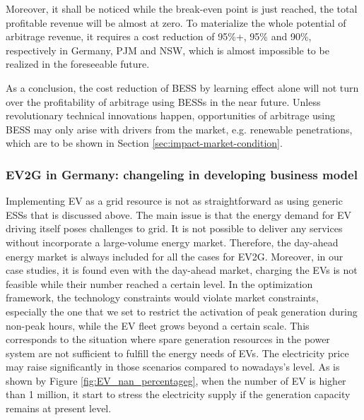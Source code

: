 Moreover, it shall be noticed while the break-even point is just reached, the total profitable revenue will be almost at zero. To materialize the whole potential of arbitrage revenue, it requires a cost reduction of 95\%+, 95\% and 90\%, respectively in Germany, PJM and NSW, which is almost impossible to be realized in the foreseeable future.

As a conclusion, the cost reduction of BESS by learning effect alone will not turn over the profitability of arbitrage using BESSs in the near future. Unless revolutionary technical innovations happen, opportunities of arbitrage using BESS may only arise with drivers from the market, e.g. renewable penetrations, which are to be shown in Section \ref{sec:impact-market-condition}.

\subsubsection{EV2G in Germany: changeling in developing business model}
Implementing EV as a grid resource is not as straightforward as using generic ESSs that is discussed above. The main issue is that the energy demand for EV driving itself poses challenges to grid. It is not possible to deliver any services without incorporate a large-volume energy market. Therefore, the day-ahead energy market is always included for all the cases for EV2G. Moreover, in our case studies, it is found even with the day-ahead market, charging the EVs is not feasible while their number reached a certain level. In the optimization framework, the technology constraints would violate market constraints, especially the one that we set to restrict the activation of peak generation during non-peak hours, while the EV fleet grows beyond a certain scale. This corresponds to the situation where spare generation resources in the power system are not sufficient  to fulfill the energy needs of EVs. The electricity price may raise significantly in those scenarios compared to nowadays's level. As is shown by Figure \ref{fig:EV_nan_percentageg}, when the number of EV is higher than 1 million, it start to stress the electricity supply if the generation capacity remains at present level. 
